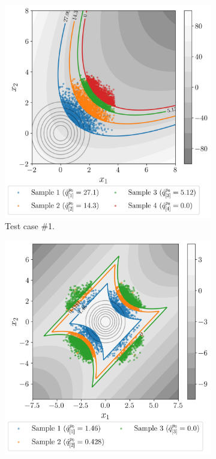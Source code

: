 \begin{figure}
    \centering
    \begin{subfigure}[b]{0.49\linewidth}
        \centering
        \includegraphics[width=\linewidth]{part3/figures/BANCS/bancs_parabolic.jpg}
        \caption{Test case \#1.}
    \end{subfigure}
    \begin{subfigure}[b]{0.48\linewidth}
        \centering
        \includegraphics[width=\linewidth]{part3/figures/BANCS/bancs_4branch.jpg}

\end{subfigure}
\end{figure}
